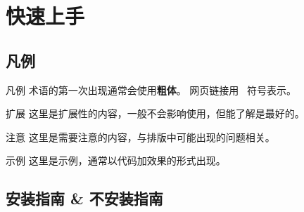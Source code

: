 \section{快速上手}

\subsection{凡例}

\begin{frame}{凡例}
  术语的第一次出现通常会使用\textbf{粗体}。
  网页链接用\ {\tiny \faLink} 符号表示。

  \begin{block}{扩展}
    这里是扩展性的内容，一般不会影响使用，但能了解是最好的。
  \end{block}

  \begin{alertblock}{注意}
    这里是需要注意的内容，与排版中可能出现的问题相关。
  \end{alertblock}

  \begin{exampleblock}{示例}
    这里是示例，通常以代码加效果的形式出现。
  \end{exampleblock}
\end{frame}

\subsection{安装指南 \& 不安装指南}

